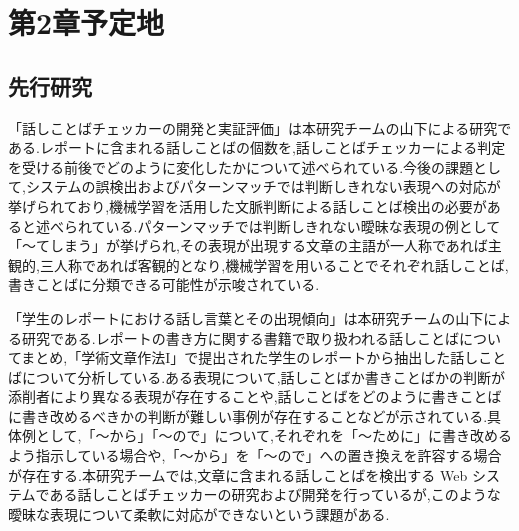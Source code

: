 \chapter{第2章予定地\label{c2}}

\section{先行研究 \label{c2s1}}
「話しことばチェッカーの開発と実証評価」は本研究チームの山下による研究である.レポートに含まれる話しことばの個数を,話しことばチェッカーによる判定を受ける前後でどのように変化したかについて述べられている.今後の課題として,システムの誤検出およびパターンマッチでは判断しきれない表現への対応が挙げられており,機械学習を活用した文脈判断による話しことば検出の必要があると述べられている.パターンマッチでは判断しきれない曖昧な表現の例として「～てしまう」が挙げられ,その表現が出現する文章の主語が一人称であれば主観的,三人称であれば客観的となり,機械学習を用いることでそれぞれ話しことば,書きことばに分類できる可能性が示唆されている.

「学生のレポートにおける話し言葉とその出現傾向」は本研究チームの山下による研究である.レポートの書き方に関する書籍で取り扱われる話しことばについてまとめ,「学術文章作法I」で提出された学生のレポートから抽出した話しことばについて分析している.ある表現について,話しことばか書きことばかの判断が添削者により異なる表現が存在することや,話しことばをどのように書きことばに書き改めるべきかの判断が難しい事例が存在することなどが示されている.具体例として,「～から」「～ので」について,それぞれを「～ために」に書き改めるよう指示している場合や,「～から」を「～ので」への置き換えを許容する場合が存在する.本研究チームでは,文章に含まれる話しことばを検出する Web システムである話しことばチェッカーの研究および開発を行っているが,このような曖昧な表現について柔軟に対応ができないという課題がある.